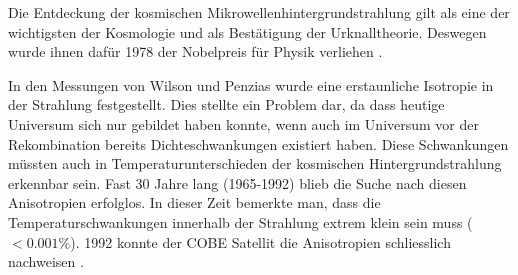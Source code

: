 Die Entdeckung der kosmischen Mikrowellenhintergrundstrahlung gilt als eine der 
wichtigsten der Kosmologie und als 
Bestätigung der Urknalltheorie.
Deswegen wurde ihnen dafür 1978 der Nobelpreis für Physik verliehen 
\cite{cmb:dicke}.

In den Messungen von Wilson und Penzias wurde eine erstaunliche Isotropie in 
%
der Strahlung festgestellt.
Dies stellte ein Problem dar, da dass heutige Universum sich nur gebildet haben 
konnte, wenn auch im Universum vor der Rekombination bereits Dichteschwankungen 
existiert haben.
Diese Schwankungen müssten auch in Temperaturunterschieden der kosmischen 
Hintergrundstrahlung erkennbar sein.
Fast 30 Jahre lang (1965-1992) blieb die Suche nach diesen Anisotropien 
erfolglos.
In dieser Zeit bemerkte man, dass die Temperaturschwankungen innerhalb der 
Strahlung extrem klein sein muss ($< 0.001\%$).
1992 konnte der \ac{COBE} Satellit die Anisotropien schliesslich nachweisen
%
%
\cite{cmb:m_schoenitzer}.


